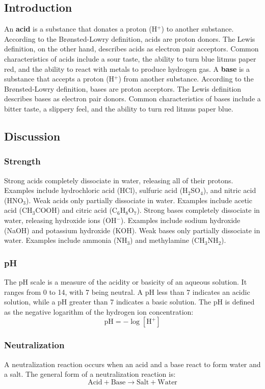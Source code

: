 \documentclass[10pt, roman]{article}
\begin{document}
\subsection{Introduction}
An \textbf{acid} is a substance that donates a proton (H\(^+\)) to another substance.
According to the Brønsted-Lowry definition, acids are proton donors. 
The Lewis definition, on the other hand, describes acids as electron pair acceptors.
Common characteristics of acids include a sour taste, the ability to turn blue litmus paper red, and the ability to react with metals to produce hydrogen gas.
A \textbf{base} is a substance that accepts a proton (H\(^+\)) from another substance.
According to the Brønsted-Lowry definition, bases are proton acceptors.
The Lewis definition describes bases as electron pair donors.
Common characteristics of bases include a bitter taste, a slippery feel, and the ability to turn red litmus paper blue.
\subsection{Discussion}
\subsubsection{Strength}
Strong acids completely dissociate in water, releasing all of their protons.
Examples include hydrochloric acid (HCl), sulfuric acid (H\(_2\)SO\(_4\)), and nitric acid (HNO\(_3\)).
Weak acids only partially dissociate in water.
Examples include acetic acid (CH\(_3\)COOH) and citric acid (C\(_6\)H\(_8\)O\(_7\)).
Strong bases completely dissociate in water, releasing hydroxide ions (OH\(^-\)).
Examples include sodium hydroxide (NaOH) and potassium hydroxide (KOH).
Weak bases only partially dissociate in water.
Examples include ammonia (NH\(_3\)) and methylamine (CH\(_3\)NH\(_2\)).
\subsubsection{pH}
The pH scale is a measure of the acidity or basicity of an aqueous solution.
It ranges from 0 to 14, with 7 being neutral.
A pH less than 7 indicates an acidic solution, while a pH greater than 7 indicates a basic solution.
The pH is defined as the negative logarithm of the hydrogen ion concentration:
\[
\text{pH} = -\log[\text{H}^+]
\]
\subsubsection{Neutralization}
A neutralization reaction occurs when an acid and a base react to form water and a salt.
The general form of a neutralization reaction is:
\[
\text{Acid} + \text{Base} \rightarrow \text{Salt} + \text{Water}
\]
\end{document}
